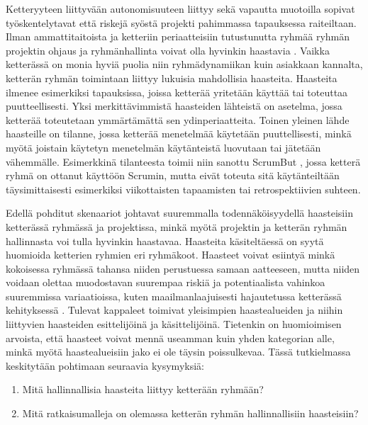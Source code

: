 Ketteryyteen liittyvään autonomisuuteen liittyy sekä vapautta muotoilla sopivat työskentelytavat että riskejä syöstä projekti pahimmassa tapauksessa raiteiltaan. Ilman ammattitaitoista ja ketteriin periaatteisiin tutustunutta ryhmää ryhmän projektin ohjaus ja ryhmänhallinta voivat olla hyvinkin haastavia \cite{7872736}. Vaikka ketterässä on monia hyviä puolia niin ryhmädynamiikan kuin asiakkaan kannalta, ketterän ryhmän toimintaan liittyy lukuisia mahdollisia haasteita. Haasteita ilmenee esimerkiksi tapauksissa, joissa ketterää yritetään käyttää tai toteuttaa puutteellisesti. Yksi merkittävimmistä haasteiden lähteistä on asetelma, jossa ketterää toteutetaan ymmärtämättä sen ydinperiaatteita. Toinen yleinen lähde haasteille on tilanne, jossa ketterää menetelmää käytetään puuttellisesti, minkä myötä joistain käytetyn menetelmän käytänteistä luovutaan tai jätetään vähemmälle. Esimerkkinä tilanteesta toimii niin sanottu ScrumBut \cite{SCRUMBUT}, jossa ketterä ryhmä on ottanut käyttöön Scrumin, mutta eivät toteuta sitä käytänteiltään täysimittaisesti esimerkiksi viikottaisten tapaamisten tai retrospektiivien suhteen.

Edellä pohditut skenaariot johtavat suuremmalla todennäköisyydellä haasteisiin ketterässä ryhmässä ja projektissa, minkä myötä projektin ja ketterän ryhmän hallinnasta voi tulla hyvinkin haastavaa. Haasteita käsiteltäessä on syytä huomioida ketterien ryhmien eri ryhmäkoot. Haasteet voivat esiintyä minkä kokoisessa ryhmässä tahansa niiden perustuessa samaan aatteeseen, mutta niiden voidaan olettaa muodostavan suurempaa riskiä ja potentiaalista vahinkoa suuremmissa variaatioissa, kuten maailmanlaajuisesti hajautetussa ketterässä kehityksessä \cite{ALZOUBI201622}. Tulevat kappaleet toimivat yleisimpien haastealueiden ja niihin liittyvien haasteiden esittelijöinä ja käsittelijöinä. Tietenkin on huomioimisen arvoista, että haasteet voivat mennä useamman kuin yhden kategorian alle, minkä myötä haastealueisiin jako ei ole täysin poissulkevaa. Tässä tutkielmassa keskitytään pohtimaan seuraavia kysymyksiä: \begin{enumerate}
    \item Mitä hallinnallisia haasteita liittyy ketterään ryhmään?
    \item Mitä ratkaisumalleja on olemassa ketterän ryhmän hallinnallisiin haasteisiin?
\end{enumerate}
